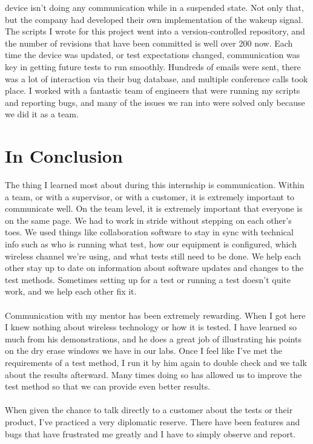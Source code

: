 \documentclass{article}
\begin{document}
device isn't doing any communication while in a suspended state. Not only that,
but the company had developed their own implementation of the wakeup signal.
The scripts I wrote for this project went into a version-controlled repository,
and the number of revisions that have been committed is well over 200 now.
Each time the device was updated, or test expectations changed, communication
was key in getting future tests to run smoothly. Hundreds of emails were sent,
there was a lot of interaction via their bug database, and multiple conference
calls took place. I worked with a fantastic team of engineers that were running
my scripts and reporting bugs, and many of the issues we ran into were solved
only because we did it as a team.

\section*{In Conclusion}
The thing I learned most about during this internship is communication. Within a
team, or with a supervisor, or with a customer, it is extremely important to
communicate well. On the team level, it is extremely important that everyone is
on the same page. We had to work in stride without stepping on each other's
toes. We used things like collaboration software to stay in sync with technical
info such as who is running what test, how our equipment is configured, which
wireless channel we're using, and what tests still need to be done. We help
each other stay up to date on information about software updates and changes to
the test methods. Sometimes setting up for a test or running a test doesn't
quite work, and we help each other fix it.\\
\\
Communication with my mentor has been extremely rewarding. When I got here I
knew nothing about wireless technology or how it is tested. I have learned so
much from his demonstrations, and he does a great job of illustrating his points
on the dry erase windows we have in our labs. Once I feel like I've met the
requirements of a test method, I run it by him again to double check and we talk
about the results afterward. Many times doing so has allowed us to improve the
test method so that we can provide even better results.\\
\\
When given the chance to talk directly to a customer about the tests or their
product, I've practiced a very diplomatic reserve. There have been features and
bugs that have frustrated me greatly and I have to simply observe and report.
\end{document}
